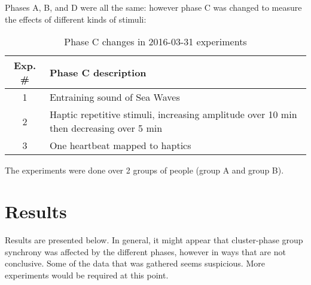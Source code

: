 \documentclass[a4paper,10pt]{article}
\begin{document}
Phases A, B, and D were all the same: however phase C was changed to measure the effects of different kinds of stimuli:

\begin{table}[h]
\caption{Phase C changes in 2016-03-31 experiments}
\begin{tabularx}{\textwidth}{|c|X|} \hline
Exp. \# & Phase C description\\\hline\hline 
1        & Entraining sound of Sea Waves\\\hline
2        & Haptic repetitive stimuli, increasing amplitude over 10 min then decreasing over 5 min\\\hline
3        & One heartbeat mapped to haptics\\\hline
\end{tabularx}
\end{table}

The experiments were done over 2 groups of people (group A and group B).

\section{Results}

Results are presented below. In general, it might appear that cluster-phase group synchrony was affected by the different phases, however in ways that are not conclusive. Some of the data that was gathered seems suspicious. More experiments would be required at this point.

 
\end{document}
